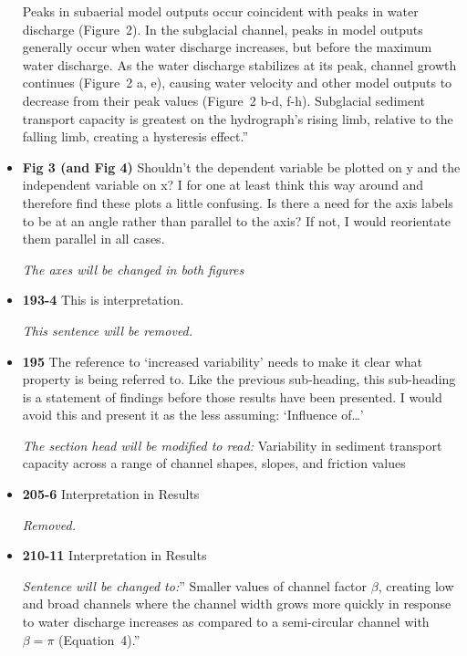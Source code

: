 \documentclass[11pt]{article}
\begin{document}
\begin{itemize}
    Peaks in subaerial model outputs occur coincident with peaks in water discharge (Figure~2).
    In the subglacial channel, peaks in model outputs generally occur when water discharge increases, but before the maximum water discharge.
    As the water discharge stabilizes at its peak, channel growth continues (Figure~2 a, e), causing water velocity and other model outputs to decrease from their peak values (Figure~2 b-d, f-h).
    Subglacial sediment transport capacity is greatest on the hydrograph's rising limb, relative to the falling limb, creating a hysteresis effect.''
  
  
\item \textbf{Fig 3 (and Fig 4)} Shouldn’t the dependent variable be plotted on y and the independent
  variable on x? I for one at least think this way around and therefore find
  these plots a little confusing.
  Is there a need for the axis labels to be at an angle rather than parallel to
  the axis? If not, I would reorientate them parallel in all cases.

  \textit{The axes will be changed in both figures}
  
\item \textbf{193-4} This is interpretation.

  \textit{This sentence will be removed.}
  
\item \textbf{195} The reference to ‘increased variability’ needs to make it clear what property
  is being referred to. Like the previous sub-heading, this sub-heading is a
  statement of findings before those results have been presented. I would
  avoid this and present it as the less assuming: ‘Influence of…’


  \textit{The section head will be modified to read:} Variability in sediment transport capacity across a range of channel shapes, slopes, and friction values

\item \textbf{205-6} Interpretation in Results

  \textit{Removed.}
  
\item \textbf{210-11} Interpretation in Results

  \textit{ Sentence will be changed to:}'' Smaller values of channel factor $\beta$, creating low and broad channels where the channel width grows more quickly in response to water discharge increases as compared to a semi-circular channel with $\beta = \pi$ (Equation~4).''
  

\end{itemize}
\end{document}
